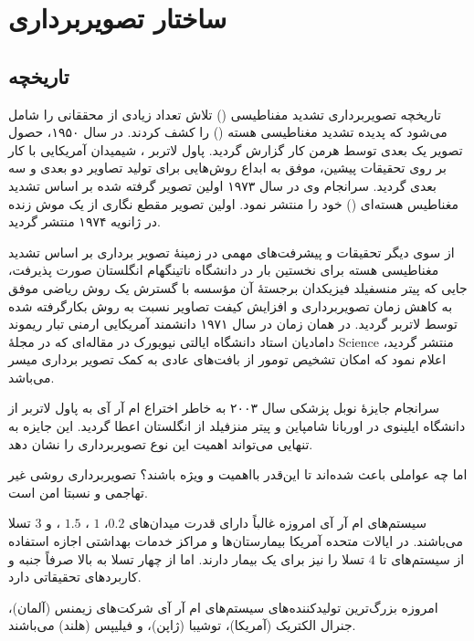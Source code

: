 \chapter{ساختار تصویربرداری \mri}\label{sec:mri-basics}

\section{تاریخچه}


تاریخچه تصویربرداری تشدید مفناطیسی
(\mri)
تلاش تعداد زیادی از محققانی را شامل می‌شود که پدیده تشدید مغناطیسی هسته
()
را کشف کردند.
در سال ۱۹۵۰، حصول تصویر یک بعدی \mri توسط هرمن کار 
 گزارش گردید. پاول لاتربر 
، شیمیدان آمریکایی با کار بر روی تحقیقات پیشین، موفق به ابداع روش‌هایی برای تولید تصاویر دو بعدی و سه بعدی \mri گردید. سرانجام وی در سال ۱۹۷۳ اولین تصویر گرفته شده بر اساس تشدید مغناطیس هسته‌ای () خود را منتشر نمود. اولین تصویر مقطع نگاری از یک موش زنده در ژانویه ۱۹۷۴ منتشر گردید.


از سوی دیگر تحقیقات و پیشرفت‌های مهمی در زمینهٔ تصویر برداری بر اساس تشدید مغناطیسی هسته برای نخستین بار در دانشگاه ناتینگهام انگلستان 
صورت پذیرفت، جایی که پیتر منسفیلد فیزیکدان برجستهٔ آن مؤسسه با گسترش یک روش ریاضی موفق به کاهش زمان تصویربرداری و افزایش کیفت تصاویر نسبت به روش بکارگرفته شده توسط لاتربر گردید. در همان زمان در سال ۱۹۷۱ دانشمند آمریکایی ارمنی تبار ریموند دامادیان استاد دانشگاه ایالتی نیویورک در مقاله‌ای که در مجلهٔ Science منتشر گردید، اعلام نمود که امکان تشخیص تومور از بافت‌های عادی به کمک تصویر برداری 
 میسر می‌باشد.

سرانجام جایزهٔ نوبل پزشکی سال ۲۰۰۳ به خاطر اختراع ام آر آی به پاول لاتربر از دانشگاه ایلینوی در اوربانا شامپاین و پیتر منزفیلد از انگلستان اعطا گردید. 
این جایزه به تنهایی می‌تواند اهمیت این نوع تصویربرداری را نشان دهد.

اما چه عواملی باعث شده‌اند تا این‌قدر \mri بااهمیت و ویژه باشند؟ تصویربرداری \mri روشی غیر تهاجمی و نسبتا امن است. 

سیستم‌های ام آر آی امروزه غالباً دارای قدرت میدان‌های $0.2$، $1$ ، $1.5$ ، و $3$ تسلا می‌باشند.
در ایالات متحده آمریکا بیمارستان‌ها و مراکز خدمات بهداشتی اجازه استفاده از سیستم‌های تا $4$ تسلا را نیز برای یک بیمار دارند. اما از چهار تسلا به بالا صرفاً جنبه و کاربردهای تحقیقاتی دارد.

امروزه بزرگ‌ترین تولیدکننده‌های سیستم‌های ام آر آی شرکت‌های زیمنس (آلمان)، جنرال الکتریک (آمریکا)، توشیبا (ژاپن)، و فیلیپس (هلند) می‌باشند.

